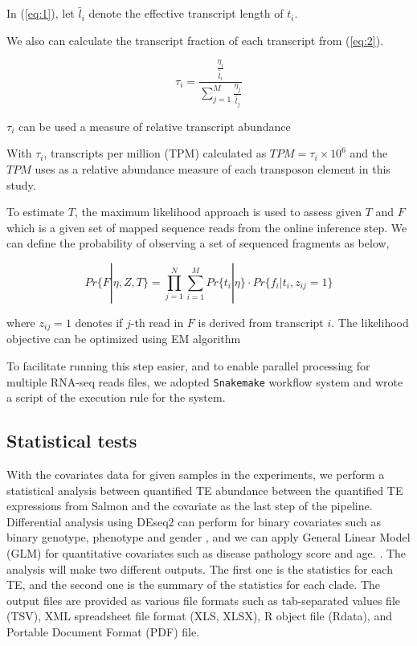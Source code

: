 \documentclass{ws-procs11x85}
\begin{document}
In (\ref{eq:1}), let $\widetilde{l_i}$ denote the effective transcript length of $t_i$\cite{li2009rna}.

We also can calculate the transcript fraction of each transcript from (\ref{eq:2}).

\begin{equation} \label{eq:2}
\tau_i = \frac{ \frac{\eta_i }{\widetilde{l_i}} }
{\sum_{j=1}^{M} \frac{\eta_j }{\widetilde{l_j}} }
\end{equation}

$\tau_i$ can be used a measure of relative transcript abundance 

With $\tau_i$, transcripts per million (TPM) calculated as $TPM=\tau_i \times 10^6$ and the $TPM$ uses as a relative abundance measure of each transposon element in this study.

To estimate $T$, the maximum likelihood approach is used to assess given $T$ and $F$ which is a given set of mapped sequence reads from 
the online inference step.
We can define the probability of observing a set of sequenced fragments as below,

\begin{equation} \label{eq:3}
Pr\{F|\eta,Z, T \}=
\prod_{j=1}^{N}\sum_{i=1}^{M} Pr\{ t_i | \eta \}  \cdot
 Pr \{ f_i | t_i , z_{ij} = 1 \}
\end{equation}

where $z_{ij} = 1$ denotes if $j$-th read in $F$ is derived from transcript $i$. The likelihood objective can be optimized using EM algorithm \cite{li2009rna}

To facilitate running this step easier, and to enable parallel processing for multiple RNA-seq reads files, we adopted \verb|Snakemake| workflow system and wrote a script of the execution rule for the system.\cite{koster2012snakemake}

\subsection{Statistical tests}

With the covariates data for given samples in the experiments, 
we perform a statistical analysis between quantified TE abundance between the quantified TE expressions from Salmon and the covariate as the last step of the pipeline. Differential analysis using DEseq2 can perform for binary covariates such as binary genotype, phenotype and gender \cite{love2014moderated}, and we can apply General Linear Model (GLM) for quantitative covariates such as disease pathology score and age. \cite{johnston1980multivariate}. The analysis will make two different outputs. The first one is the statistics for each TE, and the second one is the summary of the statistics for each clade. The output files are provided as various file formats such as tab-separated values file (TSV), XML spreadsheet file format (XLS, XLSX), R object file (Rdata), and Portable Document Format (PDF) file.
\end{document}
